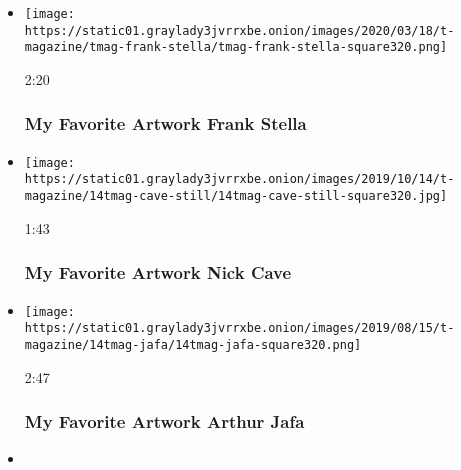 \begin{itemize}
\item
  \href{https://www.nytimes3xbfgragh.onion/video/t-magazine/100000007025848/my-favorite-artwork-frank-stella.html?action=click\&module=video-series-bar\&region=header\&pgtype=Article\&playlistId=video/my-favorite-artwork}{}

  \texttt{[image: https://static01.graylady3jvrrxbe.onion/images/2020/03/18/t-magazine/tmag-frank-stella/tmag-frank-stella-square320.png]}

  2:20

  \hypertarget{my-favorite-artwork--frank-stella}{%
  \subsubsection{My Favorite Artwork \textbar{} Frank
  Stella}\label{my-favorite-artwork--frank-stella}}
\item
  \href{https://www.nytimes3xbfgragh.onion/video/t-magazine/100000006761493/nick-cave-barkley-hendricks.html?action=click\&module=video-series-bar\&region=header\&pgtype=Article\&playlistId=video/my-favorite-artwork}{}

  \texttt{[image: https://static01.graylady3jvrrxbe.onion/images/2019/10/14/t-magazine/14tmag-cave-still/14tmag-cave-still-square320.jpg]}

  1:43

  \hypertarget{my-favorite-artwork--nick-cave}{%
  \subsubsection{My Favorite Artwork \textbar{} Nick
  Cave}\label{my-favorite-artwork--nick-cave}}
\item
  \href{https://www.nytimes3xbfgragh.onion/video/t-magazine/100000006654997/my-favorite-artwork-arthur-jafa.html?action=click\&module=video-series-bar\&region=header\&pgtype=Article\&playlistId=video/my-favorite-artwork}{}

  \texttt{[image: https://static01.graylady3jvrrxbe.onion/images/2019/08/15/t-magazine/14tmag-jafa/14tmag-jafa-square320.png]}

  2:47

  \hypertarget{my-favorite-artwork--arthur-jafa}{%
  \subsubsection{My Favorite Artwork \textbar{} Arthur
  Jafa}\label{my-favorite-artwork--arthur-jafa}}
\item
  \href{https://www.nytimes3xbfgragh.onion/video/t-magazine/100000006512916/my-favorite-artwork-jordan-casteel.html?action=click\&module=video-series-bar\&region=header\&pgtype=Article\&playlistId=video/my-favorite-artwork}{}


\end{itemize}
